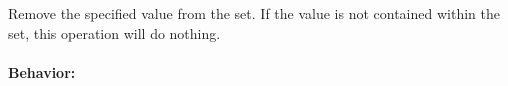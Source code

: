 Remove the specified value from the set.  If the value is not contained within
the set, this operation will do nothing.

\paragraph{Behavior:}
\begin{itemize}[noitemsep]

\end{itemize}
